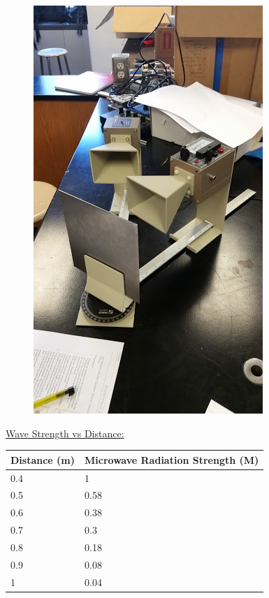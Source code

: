 \documentclass[11pt, titlepage]{article}
\begin{document}
\begin{figure}[h]
\centering
\hspace*{0cm}
\includegraphics[scale=1]{lab62.jpg}
\vspace*{0cm}
\end{figure}

\underline{Wave Strength vs Distance:}
\begin{center}
\begin{tabular}
{|m{9em}|m{18em}|}
\hline
Distance (m) & Microwave Radiation Strength (M) \\
\hline
0.4 & 1\\
\hline
0.5 & 0.58\\
\hline
0.6 & 0.38\\
\hline
0.7 & 0.3\\
\hline
0.8 & 0.18\\
\hline
0.9 & 0.08\\
\hline
1 & 0.04\\
\hline
\end{tabular}
\end{center}
\end{document}
